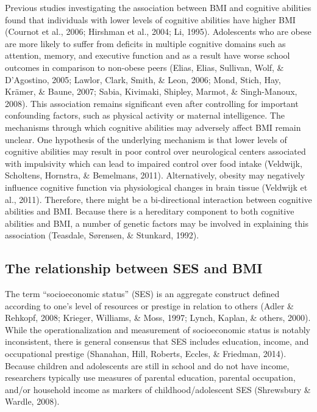 \documentclass[man]{apa6}
\begin{document}
Previous studies investigating the association between BMI and cognitive abilities found that individuals with lower levels of cognitive abilities have higher BMI (Cournot et al., 2006; Hirshman et al., 2004; Li, 1995). Adolescents who are obese are more likely to suffer from deficits in multiple cognitive domains such as attention, memory, and executive function and as a result have worse school outcomes in comparison to non-obese peers (Elias, Elias, Sullivan, Wolf, \& D'Agostino, 2005; Lawlor, Clark, Smith, \& Leon, 2006; Mond, Stich, Hay, Krämer, \& Baune, 2007; Sabia, Kivimaki, Shipley, Marmot, \& Singh-Manoux, 2008). This association remains significant even after controlling for important confounding factors, such as physical activity or maternal intelligence. The mechanisms through which cognitive abilities may adversely affect BMI remain unclear. One hypothesis of the underlying mechanism is that lower levels of cognitive abilities may result in poor control over neurological centers associated with impulsivity which can lead to impaired control over food intake (Veldwijk, Scholtens, Hornstra, \& Bemelmans, 2011). Alternatively, obesity may negatively influence cognitive function via physiological changes in brain tissue (Veldwijk et al., 2011). Therefore, there might be a bi-directional interaction between cognitive abilities and BMI. Because there is a hereditary component to both cognitive abilities and BMI, a number of genetic factors may be involved in explaining this association (Teasdale, Sørensen, \& Stunkard, 1992).

\hypertarget{the-relationship-between-ses-and-bmi}{%
\subsection{The relationship between SES and BMI}\label{the-relationship-between-ses-and-bmi}}

The term \enquote{socioeconomic status} (SES) is an aggregate construct defined according to one's level of resources or prestige in relation to others (Adler \& Rehkopf, 2008; Krieger, Williams, \& Moss, 1997; Lynch, Kaplan, \& others, 2000). While the operationalization and measurement of socioeconomic status is notably inconsistent, there is general consensus that SES includes education, income, and occupational prestige (Shanahan, Hill, Roberts, Eccles, \& Friedman, 2014). Because children and adolescents are still in school and do not have income, researchers typically use measures of parental education, parental occupation, and/or household income as markers of childhood/adolescent SES (Shrewsbury \& Wardle, 2008).
\end{document}
